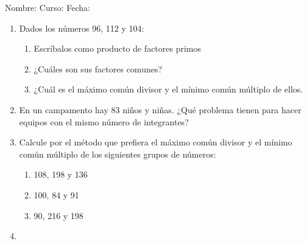 \documentclass[letterpaper,fleqn]{article}
\newcommand{\LineaNombre}{%
\par
\vspace{\baselineskip}
Nombre:\hrulefill \; Curso: \underline{\hspace*{48pt}} \; Fecha: \underline{\hspace*{2.5cm}} \relax
\par}
\begin{document}
\LineaNombre
\begin{enumerate}
 \item Dados los números 96, 112 y 104:
 \begin{enumerate}
 \item Escríbalos como producto de factores primos\noanswer
 \item ¿Cuáles son sus factores comunes?\noanswer
 \item ¿Cuál es el máximo común divisor y el mínimo común múltiplo de ellos.\noanswer
 \end{enumerate}
 \item En un campamento hay 83 niños y niñas. ¿Qué problema tienen para hacer equipos con el mismo número de integrantes?\noanswer
 \item Calcule por el método que prefiera el máximo común divisor y el mínimo común múltiplo de los siguientes grupos de números:
 \begin{enumerate}
 \item 108, 198 y 136\noanswer
 \item 100, 84 y 91\noanswer
 \item 90, 216 y 198\noanswer
 \end{enumerate}
 \item 
 \end{enumerate}
\end{document}

